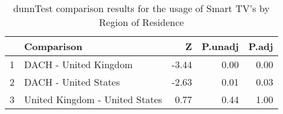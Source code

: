 \begin{table}[ht]
\centering
\begin{tabular}{rlrrr}
  \hline
 & Comparison & Z & P.unadj & P.adj \\ 
  \hline
1 & DACH - United Kingdom & -3.44 & 0.00 & 0.00 \\ 
  2 & DACH - United States & -2.63 & 0.01 & 0.03 \\ 
  3 & United Kingdom - United States & 0.77 & 0.44 & 1.00 \\ 
   \hline
\end{tabular}
\caption{dunnTest comparison results for the usage of Smart TV's by Region of Residence} 
\end{table}
